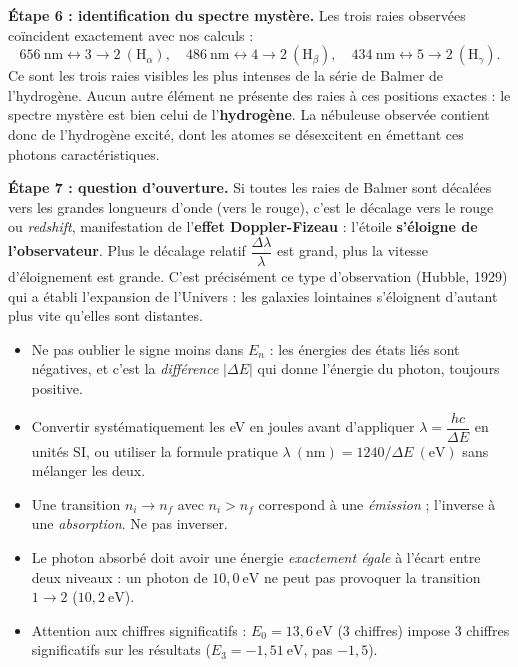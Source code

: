 \documentclass[11pt]{article}
\newcommand{\cle}[1]{{\popxbold\color{popdark}#1}}
\begin{document}
\begin{exoresolu}
\textbf{Étape 6 : identification du spectre mystère.} Les trois raies observées coïncident exactement avec nos calculs :
\[
656\ \mathrm{nm} \leftrightarrow 3 \to 2 \ (\mathrm{H}_\alpha), \quad 486\ \mathrm{nm} \leftrightarrow 4 \to 2 \ (\mathrm{H}_\beta), \quad 434\ \mathrm{nm} \leftrightarrow 5 \to 2 \ (\mathrm{H}_\gamma).
\]
Ce sont les trois raies visibles les plus intenses de la série de Balmer de l'hydrogène. Aucun autre élément ne présente des raies à ces positions exactes : le spectre mystère est bien celui de l'\textbf{hydrogène}. La nébuleuse observée contient donc de l'hydrogène excité, dont les atomes se désexcitent en émettant ces photons caractéristiques.

\textbf{Étape 7 : question d'ouverture.} Si toutes les raies de Balmer sont décalées vers les grandes longueurs d'onde (vers le rouge), c'est le \cle{décalage vers le rouge} ou \emph{redshift}, manifestation de l'\textbf{effet Doppler-Fizeau} : l'étoile \textbf{s'éloigne de l'observateur}. Plus le décalage relatif $\dfrac{\Delta \lambda}{\lambda}$ est grand, plus la vitesse d'éloignement est grande. C'est précisément ce type d'observation (Hubble, 1929) qui a établi l'expansion de l'Univers : les galaxies lointaines s'éloignent d'autant plus vite qu'elles sont distantes.
\end{exoresolu}

\begin{attention}
\begin{itemize}
\item Ne pas oublier le signe moins dans $E_n$ : les énergies des états liés sont négatives, et c'est la \emph{différence} $|\Delta E|$ qui donne l'énergie du photon, toujours positive.
\item Convertir systématiquement les eV en joules avant d'appliquer $\lambda = \dfrac{hc}{\Delta E}$ en unités SI, ou utiliser la formule pratique $\lambda\ (\mathrm{nm}) = 1240/\Delta E\ (\mathrm{eV})$ sans mélanger les deux.
\item Une transition $n_i \to n_f$ avec $n_i > n_f$ correspond à une \emph{émission} ; l'inverse à une \emph{absorption}. Ne pas inverser.
\item Le photon absorbé doit avoir une énergie \emph{exactement égale} à l'écart entre deux niveaux : un photon de $10,0\ \mathrm{eV}$ ne peut pas provoquer la transition $1 \to 2$ ($10,2\ \mathrm{eV}$).
\item Attention aux chiffres significatifs : $E_0 = 13,6\ \mathrm{eV}$ (3 chiffres) impose 3 chiffres significatifs sur les résultats ($E_3 = -1,51\ \mathrm{eV}$, pas $-1,5$).
\end{itemize}
\end{attention}
\end{document}
